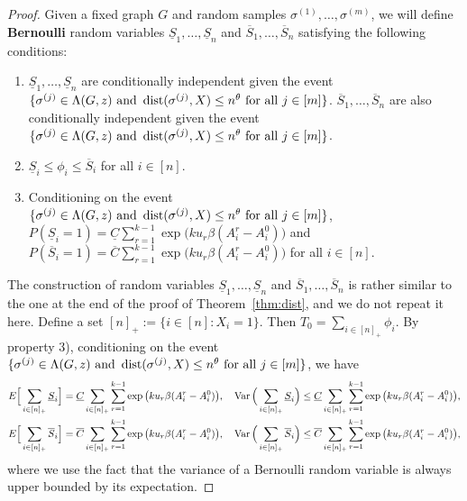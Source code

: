 \documentclass{article}
\begin{document}
\begin{proof}
	Given a fixed graph $G$ and random samples $\sigma^{(1)},\dots,\sigma^{(m)}$, we will define {\bf Bernoulli} random variables $\underline{S}_1,\dots, \underline{S}_n$ and $\overline{S}_1,\dots,\overline{S}_n$ satisfying the following conditions:
	\begin{enumerate}
		\item $\underline{S}_1,\dots, \underline{S}_n$ are conditionally independent given the event $\{\sigma^{(j)}\in  \Lambda(G, z)
		\text{~and~} \operatorname{dist}(\sigma^{(j)}, X) \le n^\theta
		\text{~for all~} j\in[m]\}$. $\overline{S}_1,\dots,\overline{S}_n$ are also conditionally independent given the event $\{\sigma^{(j)}\in  \Lambda(G, z)
		\text{~and~} \operatorname{dist}(\sigma^{(j)}, X) \le n^\theta
		\text{~for all~} j\in[m]\}$.
		\item $\underline{S}_i\le \phi_i\le \overline{S}_i$ for all $i\in[n]$.
		\item Conditioning on the event $\{\sigma^{(j)}\in  \Lambda(G, z)
		\text{~and~} \operatorname{dist}(\sigma^{(j)}, X) \le n^\theta
		\text{~for all~} j\in[m]\}$,
		$P(\underline{S}_i=1)=\underline{C}
		\sum_{r=1}^{k-1}\exp\big(k u_r \beta (A^r_i-A^0_i) \big)$ and $P(\overline{S}_i=1)=\overline{C}
		\sum_{r=1}^{k-1}\exp\big(k u_r \beta (A^r_i-A^0_i) \big)$ for all $i\in[n]$.
	\end{enumerate}
	The construction of random variables $\underline{S}_1,\dots, \underline{S}_n$ and $\overline{S}_1,\dots,\overline{S}_n$ is rather similar to the one at the end of the proof of Theorem~\ref{thm:dist}, and we do not repeat it here. 
	Define a set $[n]_+:=\{i\in[n]:X_i=1\}$.
	Then $T_0=\sum_{i\in[n]_+} \phi_i$.
	By property 3), conditioning on the event $\{\sigma^{(j)}\in  \Lambda(G, z)
	\text{~and~} \operatorname{dist}(\sigma^{(j)}, X) \le n^\theta
	\text{~for all~} j\in[m]\}$, we have
	\begin{align*}
	& E\Big[ \sum_{i\in[n]_+}\underline{S}_i \Big] = \underline{C}
	\sum_{i\in[n]_+} \sum_{r=1}^{k-1}\exp\big(k u_r \beta (A^r_i-A^0_i) \big) , \quad
	\operatorname{Var} \Big(\sum_{i\in[n]_+}\underline{S}_i \Big) \le \underline{C}
	\sum_{i\in[n]_+} \sum_{r=1}^{k-1}\exp\big(k u_r \beta (A^r_i-A^0_i) \big), \\
	& E \Big[\sum_{i\in[n]_+} \overline{S}_i \Big] = \overline{C}
	\sum_{i\in[n]_+} \sum_{r=1}^{k-1}\exp\big(k u_r \beta (A^r_i-A^0_i) \big), \quad
	\operatorname{Var} \Big(\sum_{i\in[n]_+} \overline{S}_i \Big) \le \overline{C}
	\sum_{i\in[n]_+} \sum_{r=1}^{k-1}\exp\big(k u_r \beta (A^r_i-A^0_i) \big) ,
	\end{align*}
	where we use the fact that the variance of a Bernoulli random variable is always upper bounded by its expectation.

\end{proof}
\end{document}
